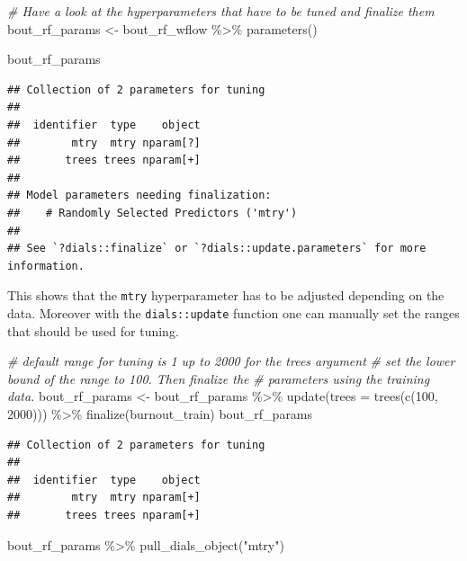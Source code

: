 \documentclass[
]{book}
\newenvironment{Shaded}{\begin{snugshade}}{\end{snugshade}}
\newcommand{\AttributeTok}[1]{\textcolor[rgb]{0.77,0.63,0.00}{#1}}
\newcommand{\CommentTok}[1]{\textcolor[rgb]{0.56,0.35,0.01}{\textit{#1}}}
\newcommand{\DecValTok}[1]{\textcolor[rgb]{0.00,0.00,0.81}{#1}}
\newcommand{\FunctionTok}[1]{\textcolor[rgb]{0.00,0.00,0.00}{#1}}
\newcommand{\NormalTok}[1]{#1}
\newcommand{\OtherTok}[1]{\textcolor[rgb]{0.56,0.35,0.01}{#1}}
\newcommand{\SpecialCharTok}[1]{\textcolor[rgb]{0.00,0.00,0.00}{#1}}
\newcommand{\StringTok}[1]{\textcolor[rgb]{0.31,0.60,0.02}{#1}}
\begin{document}
\begin{Shaded}
\begin{Highlighting}[]
\CommentTok{\# Have a look at the hyperparameters that have to be tuned and finalize them}
\NormalTok{bout\_rf\_params }\OtherTok{\textless{}{-}}\NormalTok{ bout\_rf\_wflow }\SpecialCharTok{\%\textgreater{}\%}
  \FunctionTok{parameters}\NormalTok{()}

\NormalTok{bout\_rf\_params }
\end{Highlighting}
\end{Shaded}

\begin{verbatim}
## Collection of 2 parameters for tuning
## 
##  identifier  type    object
##        mtry  mtry nparam[?]
##       trees trees nparam[+]
## 
## Model parameters needing finalization:
##    # Randomly Selected Predictors ('mtry')
## 
## See `?dials::finalize` or `?dials::update.parameters` for more information.
\end{verbatim}

This shows that the \texttt{mtry} hyperparameter has to be adjusted depending on the data. Moreover with the \texttt{dials::update} function one can manually set the ranges that should be used for tuning.

\begin{Shaded}
\begin{Highlighting}[]
\CommentTok{\# default range for tuning is 1 up to 2000 for the trees argument}
\CommentTok{\# set the lower bound of the range to 100. Then finalize the}
\CommentTok{\# parameters using the training data.}
\NormalTok{bout\_rf\_params }\OtherTok{\textless{}{-}}\NormalTok{ bout\_rf\_params }\SpecialCharTok{\%\textgreater{}\%}
  \FunctionTok{update}\NormalTok{(}\AttributeTok{trees =} \FunctionTok{trees}\NormalTok{(}\FunctionTok{c}\NormalTok{(}\DecValTok{100}\NormalTok{, }\DecValTok{2000}\NormalTok{))) }\SpecialCharTok{\%\textgreater{}\%}
  \FunctionTok{finalize}\NormalTok{(burnout\_train)}
\NormalTok{bout\_rf\_params}
\end{Highlighting}
\end{Shaded}

\begin{verbatim}
## Collection of 2 parameters for tuning
## 
##  identifier  type    object
##        mtry  mtry nparam[+]
##       trees trees nparam[+]
\end{verbatim}

\begin{Shaded}
\begin{Highlighting}[]
\NormalTok{bout\_rf\_params }\SpecialCharTok{\%\textgreater{}\%} \FunctionTok{pull\_dials\_object}\NormalTok{(}\StringTok{"mtry"}\NormalTok{)}
\end{Highlighting}
\end{Shaded}
\end{document}
